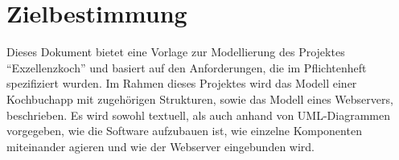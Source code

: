 \chapter{Zielbestimmung}

Dieses Dokument bietet eine Vorlage zur Modellierung des Projektes "`Exzellenzkoch"' und basiert auf den Anforderungen, die im Pflichtenheft spezifiziert wurden. Im Rahmen dieses Projektes wird das Modell einer Kochbuchapp mit zugehörigen Strukturen, sowie das Modell eines Webservers, beschrieben.
Es wird sowohl textuell, als auch anhand von UML-Diagrammen vorgegeben, wie die Software aufzubauen ist, wie einzelne Komponenten miteinander agieren und wie der Webserver eingebunden wird.